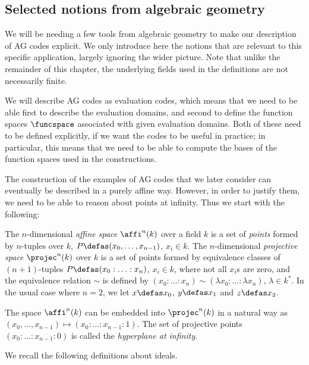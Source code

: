 \subsection{Selected notions from algebraic geometry}

We will be needing a few tools from algebraic geometry to make our description of AG codes explicit. We only introduce
here the notions that are relevant to this specific application,
largely ignoring the wider picture. Note that unlike the remainder of this chapter, the underlying fields used in the definitions
are not necessarily finite.

We will describe AG codes as evaluation codes, which means that we need to be able first to describe the evaluation domains,
and second to
define the function spaces $\funcspace$ associated with given evaluation domains. Both of these need to be defined explicitly,
if we want the codes to be useful in practice; in particular, this means that we need to be able
to compute the bases of the function spaces used in the constructions.

\medskip

The construction of the examples of AG codes that we later consider can eventually be described in a purely affine way. However, in order to
justify them, we need to be able to reason about points at infinity. Thus we start with the following:

\begin{defi}
\label{def:affiprojec}
The $n$-dimensional \emph{affine space} $\affi^n(k)$ over a field $k$ is a set of \emph{points} formed by $n$-tuples over $k$,
$P \defas (x_0, \ldots, x_{n-1})$, $x_i \in k$.
The $n$-dimensional \emph{projective space} $\projec^n(k)$ over $k$ is a set of points formed by equivalence classes of $(n+1)$-tuples
$P \defas (x_0 : \ldots : x_n)$, $x_i \in k$, where not all $x_i$s are zero, and the equivalence relation $\sim$ is
defined by $(x_0 : \ldots : x_n) \sim (\lambda x_0 : \ldots : \lambda x_n)$, $\lambda \in k^*$. In the usual case where $n = 2$, we let
$x \defas x_0$, $y \defas x_1$ and $z \defas x_2$.

\noindent
The space $\affi^n(k)$ can be embedded into $\projec^n(k)$ in a natural way as $(x_0, \ldots, x_{n-1}) \mapsto (x_0 : \ldots : x_{n-1} : 1)$.
The set of projective points $(x_0 : \ldots : x_{n-1} : 0)$ is called the \emph{hyperplane at infinity}.
\end{defi}

We recall the following definitions about ideals.

